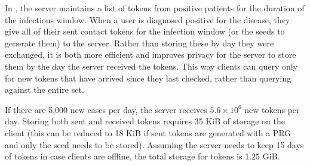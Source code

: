 In \dect, the server maintains a list of tokens from positive patients for the duration of the infectious window. When a user is diagnosed positive for the disease, they give all of their sent contact tokens for the infection window (or the seeds to generate them) to the server. Rather than storing these by day they were exchanged, it is  both more efficient and improves privacy for the server to store them by the day the server received the tokens. This way clients can query only for new tokens that have arrived since they last checked, rather than querying against the entire set.

 If there are 5,000 new cases per day, the server receives $5.6 \times 10^6$ new tokens per day. Storing both sent and received tokens requires 35 KiB of storage on the client (this can be reduced to 18 KiB if sent tokens are generated with a PRG and only the seed needs to be stored). Assuming the server needs to keep 15 days of tokens in case clients are offline, the total storage for tokens is 1.25 GiB.




